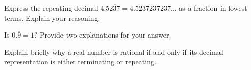 \documentclass[space,handout,nooutcomes]{ximera}
\begin{document}
\begin{problem}
Express the repeating decimal $4.5\overline{237} = 4.5237237237\dots$ as a fraction in lowest terms.  Explain your reasoning.   
\end{problem}

\begin{problem}
Is $0.\overline{9}=1$?  Provide two explanations for your answer.  
\end{problem}

\begin{problem}
Explain briefly why a real number is rational if and only if its decimal representation is either terminating or repeating.  
\end{problem}
\end{document}
